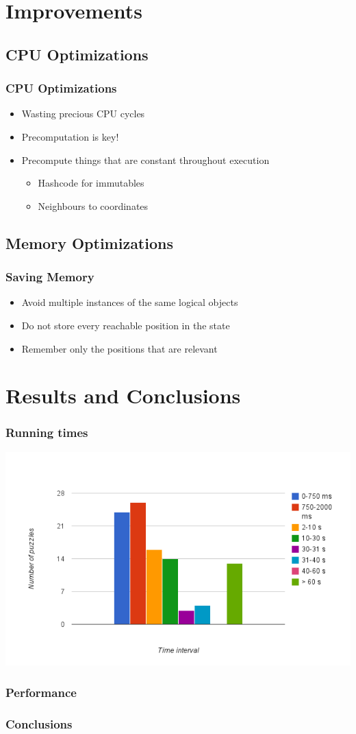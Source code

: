 \documentclass[]{beamer}
\begin{document}
\section{Improvements}
\subsection{CPU Optimizations}

\begin{frame}
	\frametitle{CPU Optimizations}
	\begin{itemize}
		\item{Wasting precious CPU cycles}
		\item{Precomputation is key!}
		\item{Precompute things that are constant throughout execution
			\begin{itemize}
				\item{Hashcode for immutables}
				\item{Neighbours to coordinates}
			\end{itemize}
		}
	\end{itemize}
\end{frame}

\subsection{Memory Optimizations}

\begin{frame}
	\frametitle{Saving Memory}
	\begin{itemize}
		\item{Avoid multiple instances of the same logical objects}
		\item{Do not store every reachable position in the state}
		\item{Remember only the positions that are relevant}
	\end{itemize}
\end{frame}

\section{Results and Conclusions}

\begin{frame}
	\frametitle{Running times}
	\includegraphics[width=\textwidth]{time_graph}
\end{frame}

\begin{frame}
	\frametitle{Performance}
\end{frame}

\begin{frame}
	\frametitle{Conclusions}
\end{frame}
\end{document}
